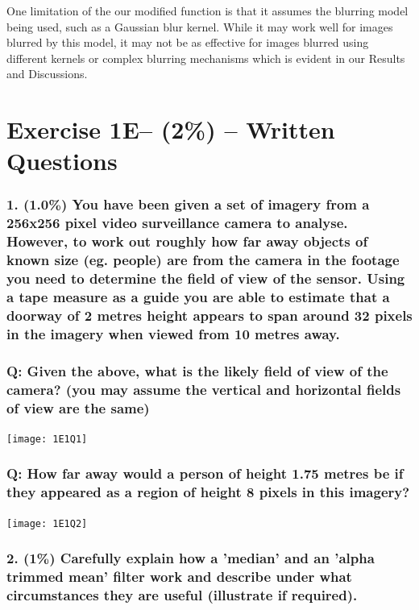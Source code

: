 \documentclass{article}
\begin{document}
	\noindent One limitation of the our modified function is that it assumes the blurring model being used, such as a Gaussian blur kernel. While it may work well for images blurred by this model, 
	it may not be as effective for images blurred using different kernels or complex blurring mechanisms which is evident in our Results and Discussions. 



	\vspace{0.5cm}
	
\newpage
	

	\section*{Exercise 1E– (2\%) – Written Questions }
	
	\subsubsection*{1. (1.0\%) You have been given a set of imagery from a 256x256 pixel video surveillance camera to analyse. However, to work out roughly how far away objects of known size (eg. people) are from the camera in the footage you need to determine the field of view of the sensor. Using a tape measure as a guide you are able to estimate that a doorway of 2 metres height appears to span around 32 pixels in the imagery when viewed from 10 metres away.}
	
	\subsubsection*{Q: Given the above, what is the likely field of view of the camera?  (you may assume the vertical and horizontal fields of view are the same)}
	\texttt{[image: 1E1Q1]}
	
	\subsubsection*{Q: How far away would a person of height 1.75 metres be if they appeared as a region of height 8 pixels in this imagery?}
	\texttt{[image: 1E1Q2]}

	\subsubsection*{2. (1\%) Carefully explain how a 'median' and an 'alpha trimmed mean' filter work and describe under what circumstances they are useful (illustrate if required).}
\end{document}
